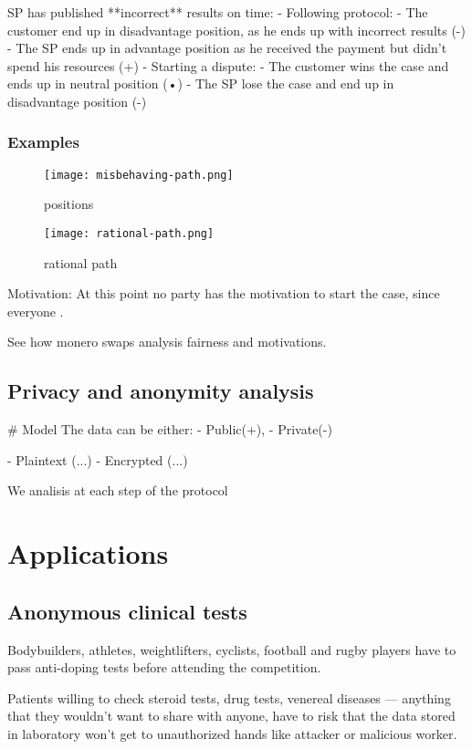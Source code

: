 \documentclass{article}
\begin{document}
SP has published **incorrect** results on time:
- Following protocol:
	- The customer end up in disadvantage position, as he ends up with incorrect results (-)
	- The SP ends up in advantage position as he received the payment but didn't spend his resources (+)
- Starting a dispute:
	- The customer wins the case and ends up in neutral position (•)
	- The SP lose the case and end up in disadvantage position (-)

\subsubsection{Examples}


\begin{figure}[h!]
    \centering
    \texttt{[image: misbehaving-path.png]}
    \caption{positions}
    \label{fig:my_label}
\end{figure}

\begin{figure}[h!]
    \centering
    \texttt{[image: rational-path.png]}
    \caption{rational path}
    \label{fig:my_label}
\end{figure}


Motivation:
At this point no party has the motivation to start the case, since everyone  . 


See how monero swaps analysis fairness and motivations.


\subsection{Privacy and anonymity analysis}

# Model
The data can be either:
- Public(+), 
- Private(-)

- Plaintext (...)
- Encrypted (...)

We analisis at each step of the protocol

\section{Applications}
\subsection{Anonymous clinical tests}
Bodybuilders, athletes,  weightlifters, cyclists, football and rugby players have to pass anti-doping tests before attending the competition. 

Patients willing to check steroid tests, drug tests, venereal diseases — anything that they wouldn't want to share with anyone, have to risk that the data stored in laboratory won't get to unauthorized hands like attacker or malicious worker.
\end{document}
